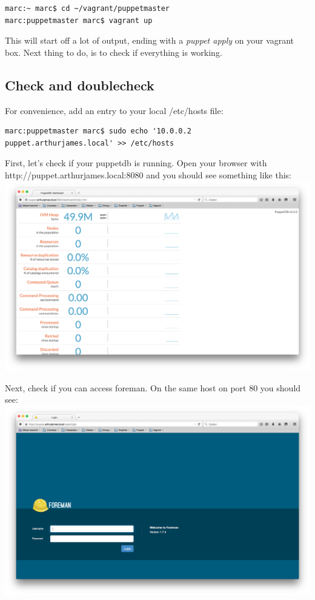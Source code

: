 \documentclass{article}
\begin{document}
\begin{verbatim}
marc:~ marc$ cd ~/vagrant/puppetmaster
marc:puppetmaster marc$ vagrant up
\end{verbatim}

This will start off a lot of output, ending with a \emph{puppet apply} on your vagrant box. Next thing to do, is to check if everything is working.

\subsection{Check and doublecheck}
For convenience, add an entry to your local /etc/hosts file:\\
\begin{verbatim}
marc:puppetmaster marc$ sudo echo '10.0.0.2        puppet.arthurjames.local' >> /etc/hosts
\end{verbatim}

\par First, let's check if your puppetdb is running. Open your browser with http://puppet.arthurjames.local:8080 and you should see something like this:\\
\includegraphics[scale=0.3]{images/puppetdb}


\par Next, check if you can access foreman. On the same host on port 80 you should see:\\
\includegraphics[scale=0.3]{images/foreman}
\end{document}
